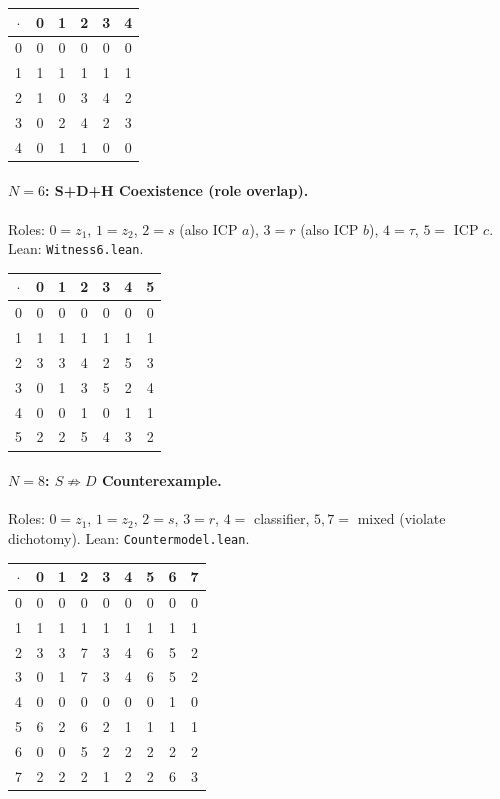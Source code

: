 \documentclass[sigconf,screen,review,anonymous]{acmart}
\newcommand{\dotop}{\cdot}
\begin{document}
\medskip
{\small
\begin{tabular}{c|ccccc}
$\dotop$ & 0 & 1 & 2 & 3 & 4 \\\hline
0 & 0 & 0 & 0 & 0 & 0 \\
1 & 1 & 1 & 1 & 1 & 1 \\
2 & 1 & 0 & 3 & 4 & 2 \\
3 & 0 & 2 & 4 & 2 & 3 \\
4 & 0 & 1 & 1 & 0 & 0 \\
\end{tabular}}

\paragraph{$N\!=\!6$: S+D+H Coexistence (role overlap).}
Roles: $0 = z_1$, $1 = z_2$, $2 = s$ (also ICP $a$), $3 = r$ (also ICP $b$), $4 = \tau$, $5 =$ ICP $c$. \quad Lean: \texttt{Witness6.lean}.

\medskip
{\small
\begin{tabular}{c|cccccc}
$\dotop$ & 0 & 1 & 2 & 3 & 4 & 5 \\\hline
0 & 0 & 0 & 0 & 0 & 0 & 0 \\
1 & 1 & 1 & 1 & 1 & 1 & 1 \\
2 & 3 & 3 & 4 & 2 & 5 & 3 \\
3 & 0 & 1 & 3 & 5 & 2 & 4 \\
4 & 0 & 0 & 1 & 0 & 1 & 1 \\
5 & 2 & 2 & 5 & 4 & 3 & 2 \\
\end{tabular}}

\paragraph{$N\!=\!8$: $S \not\Rightarrow D$ Counterexample.}
Roles: $0 = z_1$, $1 = z_2$, $2 = s$, $3 = r$, $4 =$ classifier, $5, 7 =$ mixed (violate dichotomy). \quad Lean: \texttt{Countermodel.lean}.

\medskip
{\small
\begin{tabular}{c|cccccccc}
$\dotop$ & 0 & 1 & 2 & 3 & 4 & 5 & 6 & 7 \\\hline
0 & 0 & 0 & 0 & 0 & 0 & 0 & 0 & 0 \\
1 & 1 & 1 & 1 & 1 & 1 & 1 & 1 & 1 \\
2 & 3 & 3 & 7 & 3 & 4 & 6 & 5 & 2 \\
3 & 0 & 1 & 7 & 3 & 4 & 6 & 5 & 2 \\
4 & 0 & 0 & 0 & 0 & 0 & 0 & 1 & 0 \\
5 & 6 & 2 & 6 & 2 & 1 & 1 & 1 & 1 \\
6 & 0 & 0 & 5 & 2 & 2 & 2 & 2 & 2 \\
7 & 2 & 2 & 2 & 1 & 2 & 2 & 6 & 3 \\
\end{tabular}}
\end{document}
